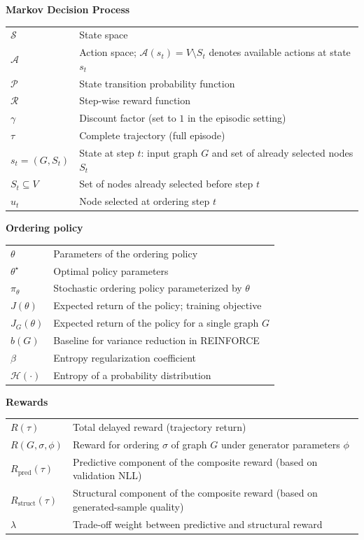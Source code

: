 \documentclass[12pt,a4paper,oneside]{report}
\begin{document}
\noindent\textbf{Markov Decision Process}
\begin{longtable}{p{3.8cm}p{10.2cm}}
$\mathcal{S}$              & State space \\
$\mathcal{A}$              & Action space; $\mathcal{A}(s_t)=V\setminus S_t$ denotes available actions at state $s_t$ \\
$\mathcal{P}$              & State transition probability function \\
$\mathcal{R}$              & Step-wise reward function \\
$\gamma$                   & Discount factor (set to $1$ in the episodic setting) \\
$\tau$                     & Complete trajectory (full episode) \\
$s_t=(G,S_t)$              & State at step $t$: input graph $G$ and set of already selected nodes $S_t$ \\
$S_t\subseteq V$           & Set of nodes already selected before step $t$ \\
$u_t$                      & Node selected at ordering step $t$ \\
\end{longtable}

\noindent\textbf{Ordering policy}
\begin{longtable}{p{3.8cm}p{10.2cm}}
$\theta$                   & Parameters of the ordering policy \\
$\theta^\star$             & Optimal policy parameters \\
$\pi_\theta$               & Stochastic ordering policy parameterized by $\theta$ \\
$J(\theta)$                & Expected return of the policy; training objective \\
$J_G(\theta)$              & Expected return of the policy for a single graph $G$ \\
$b(G)$                     & Baseline for variance reduction in REINFORCE \\
$\beta$                    & Entropy regularization coefficient \\
$\mathcal{H}(\cdot)$       & Entropy of a probability distribution \\
\end{longtable}

\noindent\textbf{Rewards}
\begin{longtable}{p{3.8cm}p{10.2cm}}
$R(\tau)$                  & Total delayed reward (trajectory return) \\
$R(G,\sigma,\phi)$         & Reward for ordering $\sigma$ of graph $G$ under generator parameters $\phi$ \\
$R_{\mathrm{pred}}(\tau)$  & Predictive component of the composite reward (based on validation NLL) \\
$R_{\mathrm{struct}}(\tau)$& Structural component of the composite reward (based on generated-sample quality) \\
$\lambda$                  & Trade-off weight between predictive and structural reward \\
\end{longtable}
\end{document}
